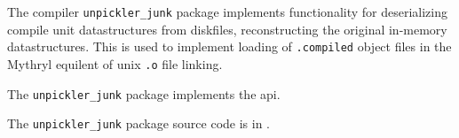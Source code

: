 
The compiler {\tt unpickler\_junk} package implements functionality for 
deserializing compile unit datastructures from diskfiles, reconstructing 
the original in-memory datastructures.  This is used to implement loading 
of {\tt .compiled} object files in the Mythryl equilent of unix {\tt .o} file 
linking.

The {\tt unpickler\_junk} package implements the  api.

The {\tt unpickler\_junk} package source code is in .

